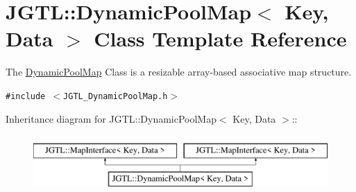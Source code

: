 \hypertarget{class_j_g_t_l_1_1_dynamic_pool_map}{
\section{JGTL::Dynamic\-Pool\-Map$<$ Key, Data $>$ Class Template Reference}
\label{class_j_g_t_l_1_1_dynamic_pool_map}
}
The \hyperlink{class_j_g_t_l_1_1_dynamic_pool_map}{Dynamic\-Pool\-Map} Class is a resizable array-based associative map structure.  


{\tt \#include $<$JGTL\_\-Dynamic\-Pool\-Map.h$>$}

Inheritance diagram for JGTL::Dynamic\-Pool\-Map$<$ Key, Data $>$::\begin{figure}[H]
\begin{center}
\leavevmode
\includegraphics[height=2cm]{class_j_g_t_l_1_1_dynamic_pool_map}
\end{center}
\end{figure}
